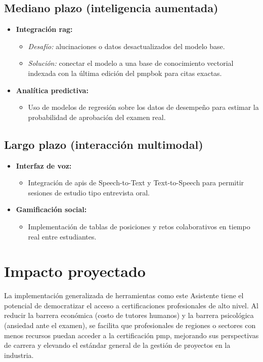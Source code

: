 \subsection{Mediano plazo (inteligencia aumentada)}
\begin{itemize}
\item \textbf{Integración \gls{rag}:}
\begin{itemize}
\item \textit{Desafío:} alucinaciones o datos desactualizados del modelo base.
\item \textit{Solución:} conectar el modelo a una base de conocimiento vectorial indexada con la última edición del \gls{pmpbok} para citas exactas.
\end{itemize}
\item \textbf{Analítica predictiva:}
\begin{itemize}
\item Uso de modelos de regresión sobre los datos de desempeño para estimar la probabilidad de aprobación del examen real.
\end{itemize}
\end{itemize}

\subsection{Largo plazo (interacción multimodal)}
\begin{itemize}
\item \textbf{Interfaz de voz:}
\begin{itemize}
\item Integración de \glspl{api} de Speech-to-Text y Text-to-Speech para permitir sesiones de estudio tipo entrevista oral.
\end{itemize}
\item \textbf{Gamificación social:}
\begin{itemize}
\item Implementación de tablas de posiciones y retos colaborativos en tiempo real entre estudiantes.
\end{itemize}
\end{itemize}

\section{Impacto proyectado}

La implementación generalizada de herramientas como este Asistente tiene el potencial de democratizar el acceso a certificaciones profesionales de alto nivel. Al reducir la barrera económica (costo de tutores humanos) y la barrera psicológica (ansiedad ante el examen), se facilita que profesionales de regiones o sectores con menos recursos puedan acceder a la certificación \gls{pmp}, mejorando sus perspectivas de carrera y elevando el estándar general de la gestión de proyectos en la industria.

